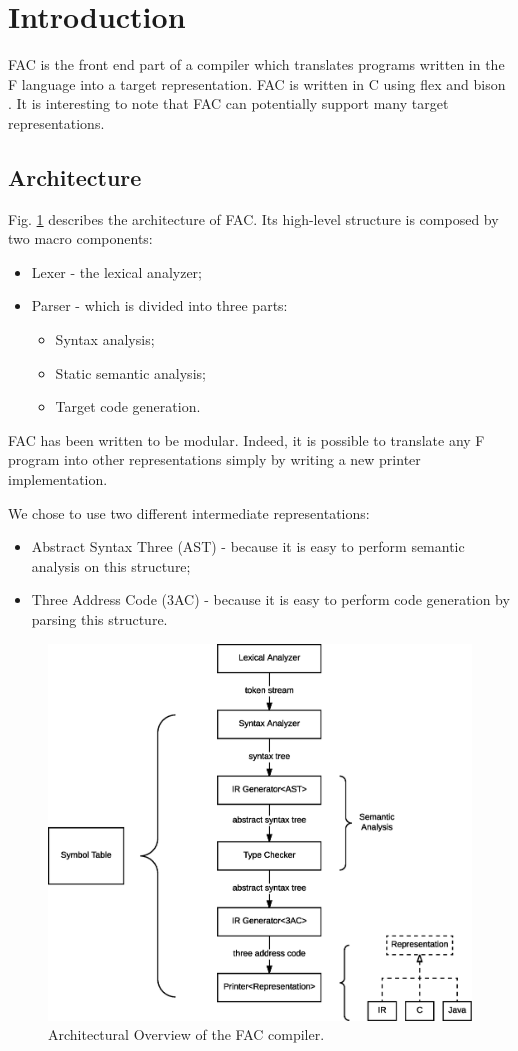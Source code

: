 \section*{Introduction}

FAC is the front end part of a compiler which translates programs written in the
F language into a target representation. FAC is written in C using
flex \cite{flex-online} and bison \cite{bison-online}.
It is interesting to note that FAC can potentially support many target
representations.

\subsection*{Architecture}
Fig. \ref{fig:arch-ovw} describes the architecture of FAC.
Its high-level structure is composed by two macro components:
\begin{itemize}
\item Lexer - the lexical analyzer;
\item Parser - which is divided into three parts:
\begin{itemize}
	\item Syntax analysis;
	\item Static semantic analysis;
	\item Target code generation.
\end{itemize}
\end{itemize}

FAC has been written to be modular. Indeed, it is possible to translate any F
program into other representations simply by writing a new printer
implementation.

We chose to use two different intermediate representations:
\begin{itemize}
\item Abstract Syntax Three (AST) - because it is easy to perform semantic
analysis on this structure;
\item Three Address Code (3AC) - because it is easy to perform code generation
by parsing this structure.
\end{itemize}

\begin{figure}[H]
  \centering
  \includegraphics[width=.9\columnwidth]{img/eps/architecture.eps}
  \caption{Architectural Overview of the FAC compiler.}
  \label{fig:arch-ovw}
\end{figure}

